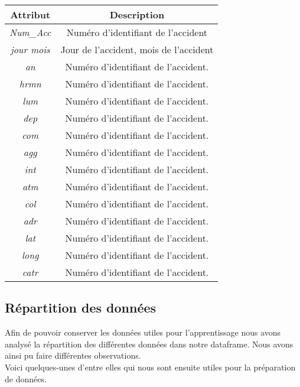 \documentclass[]{article}
\begin{document}
    \begin{center}
        \begin{tabular}{ |c|c| }
            \hline
            \textbf{Attribut} & \textbf{Description} \\
            \hline
            \textit{Num\_Acc} & Numéro d'identifiant de l'accident \\
            \textit{jour mois} & Jour de l'accident, mois de l'accident \\
            \textit{an} & Numéro d'identifiant de l'accident. \\
            \textit{hrmn} & Numéro d'identifiant de l'accident. \\
            \textit{lum} & Numéro d'identifiant de l'accident. \\
            \textit{dep} & Numéro d'identifiant de l'accident. \\
            \textit{com} & Numéro d'identifiant de l'accident. \\
            \textit{agg} & Numéro d'identifiant de l'accident. \\
            \textit{int} & Numéro d'identifiant de l'accident. \\
            \textit{atm} & Numéro d'identifiant de l'accident. \\
            \textit{col} & Numéro d'identifiant de l'accident. \\
            \textit{adr} & Numéro d'identifiant de l'accident. \\
            \textit{lat} & Numéro d'identifiant de l'accident. \\
            \textit{long} & Numéro d'identifiant de l'accident. \\
            \textit{catr} & Numéro d'identifiant de l'accident. \\        
            \hline
        \end{tabular}
    \end{center}

    \subsection{Répartition des données}
    Afin de pouvoir conserver les données utiles pour l'apprentissage nous avons analysé la répartition des 
    différentes données dans notre dataframe.
    Nous avons ainsi pu faire différentes observations. 
    \\
    Voici quelques-unes d'entre elles qui nous sont ensuite
    utiles pour la préparation de données.
\end{document}
